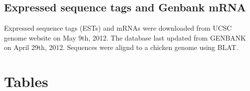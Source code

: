 \documentclass[10pt]{article}
\begin{document}
\subsection*{Expressed sequence tags and Genbank mRNA}
Expressed sequence tags (ESTs) and mRNAs were downloaded from UCSC genome website on May 9th, 2012.
The database last updated from GENBANK on April 29th, 2012.
Sequences were alignd to a chicken genome using BLAT.



\section*{Tables}
\end{document}
